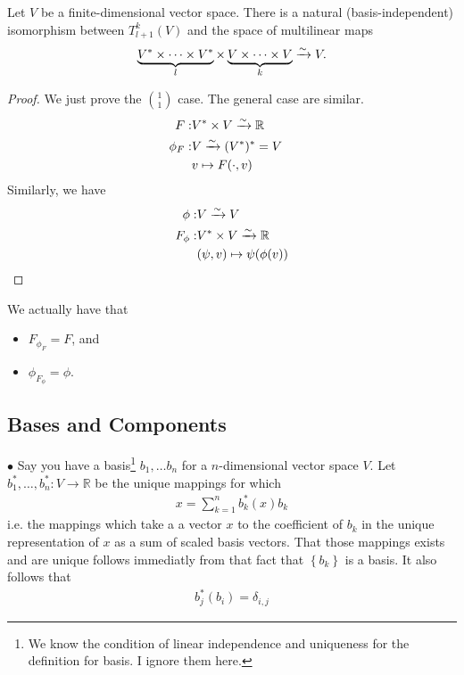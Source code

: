 \documentclass[12pt]{article} %
\begin{document}
\begin{lema}\label{lem:doncadfa}
 Let $V$ be a finite-dimensional vector space. There is a natural (basis-independent) isomorphism between $T_{l+1}^{k}(V)$ and the space of multilinear maps
\begin{align*}
\underbrace{V^{*} \times \cdots \times V^{*}}_{l} \times \underbrace{V \times \cdots \times V}_{k} \xrightarrow{\sim} V .
\end{align*}
\end{lema}
\begin{proof}
We just prove the $\binom{1}{1}$ case. The general case are similar. 
\begin{align*}
F: &V^*\times V\xrightarrow{\sim}\mathbb{R}\\
\phi_F: &V\xrightarrow{\sim}(V^*)^*=V\\
&v\mapsto F(\cdot, v)&
\end{align*}
Similarly, we have
\begin{align*}
\phi: &V\xrightarrow{\sim} V\\
F_\phi:  &V^*\times V\xrightarrow{\sim}\mathbb{R}\\
&(\psi,v)\mapsto \psi(\phi(v))
\end{align*}
\end{proof}
\begin{rema}We actually have that 
\begin{itemize}
 \item $F_{\phi_F} = F$, and
    \item $\phi_{F_{\phi}}=\phi$.
\end{itemize}
\end{rema}
\subsection{Bases and Components}\label{sec:dfadfgr}
$\bullet$ 
Say you have a basis\footnote{We know the condition of linear independence and uniqueness for the definition for basis. I ignore them here.} $b_{1}, \ldots b_{n}$ for a $n$-dimensional vector space $V$. Let $b_{1}^{*}, \ldots, b_{n}^{*}: V \rightarrow \mathbb{R}$ be the unique mappings for which
\begin{align*}
x=\sum_{k=1}^{n} b_{k}^{*}(x) b_{k}
\end{align*}
i.e. the mappings which take a a vector $x$ to the coefficient of $b_{k}$ in the unique representation of $x$ as a sum of scaled basis vectors. That those mappings exists and are unique follows immediatly from that fact that $\left\{b_{k}\right\}$ is a basis. It also follows that
\begin{align*}
b_{j}^{*}\left(b_{i}\right)=\delta_{i, j}
\end{align*}
\end{document}
